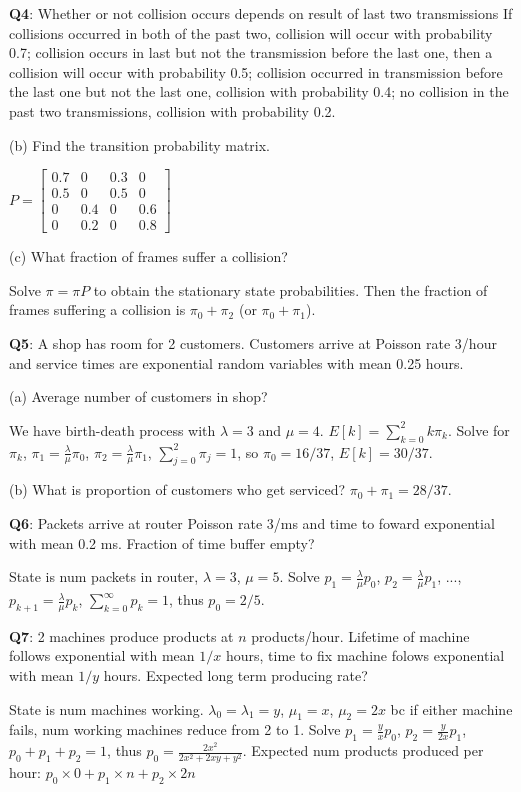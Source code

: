 \documentclass{scrartcl}
\begin{document}
\begin{multicols*}{3}
{\bf Q4}: Whether or not collision occurs depends on result of last two transmissions If collisions occurred in both of the past two, collision will occur with probability 0.7; collision occurs in last but not the transmission before the last one, then a collision will occur with probability 0.5; collision occurred in transmission before the last one but not the last one, collision with probability 0.4; no collision in the past two transmissions, collision with probability 0.2.

(b) Find the transition probability matrix.

$P=\begin{bmatrix}0.7 & 0 & 0.3 & 0 \\ 0.5 & 0 & 0.5 & 0 \\ 0 & 0.4 & 0 & 0.6 \\ 0 & 0.2 & 0 & 0.8\end{bmatrix}$

(c) What fraction of frames suffer a collision?

Solve $\pi = \pi P$ to obtain the stationary state probabilities. Then the fraction of frames suffering a collision is $\pi_0 + \pi_2$ (or $\pi_0 + \pi_1$).



{\bf Q5}: A shop has room for 2 customers. Customers arrive at Poisson rate 3/hour and service times are exponential random variables with mean 0.25 hours.

(a) Average number of customers in shop?

We have birth-death process with $\lambda=3$ and $\mu=4$. $E[k] = \sum_{k=0}^2k\pi_k$. Solve for $\pi_k$, $\pi_1=\frac{\lambda}{\mu}\pi_0$, $\pi_2=\frac{\lambda}{\mu}\pi_1$, $\sum_{j=0}^2\pi_j=1$, so $\pi_0=16/37$, $E[k]=30/37$.

(b) What is proportion of customers who get serviced? $\pi_0+\pi_1=28/37$.



{\bf Q6}: Packets arrive at router Poisson rate 3/ms and time to foward exponential with mean 0.2 ms. Fraction of time buffer empty?

State is num packets in router, $\lambda=3$, $\mu=5$. Solve $p_1=\frac{\lambda}{\mu}p_0$, $p_2=\frac{\lambda}{\mu}p_1$, ..., $p_{k+1}=\frac{\lambda}{\mu}p_k$, $\sum_{k=0}^\infty p_k=1$, thus $p_0=2/5$.



{\bf Q7}: 2 machines produce products at $n$ products/hour. Lifetime of machine follows exponential with mean $1/x$ hours, time to fix machine folows exponential with mean $1/y$ hours. Expected long term producing rate?

State is num machines working. $\lambda_0=\lambda_1=y$, $\mu_1=x$, $\mu_2=2x$ bc if either machine fails, num working machines reduce from 2 to 1. Solve $p_1=\frac{y}{x}p_0$, $p_2=\frac{y}{2x}p_1$, $p_0+p_1+p_2=1$, thus $p_0=\frac{2x^2}{2x^2+2xy+y^2}$. Expected num products produced per hour: $p_0\times 0+p_1\times n+p_2\times 2n$


\end{multicols*}
\end{document}
